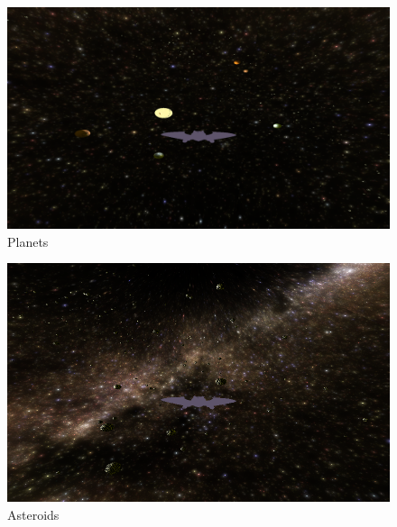 \documentclass[a4paper,12pt]{article}
\begin{document}
\begin{figure}[h!]
        \centering
        \centerline{\includegraphics[width=1.2\textwidth]{bild/planets.png}}
        \caption{Planets}
        \label{fig:planets}
\end{figure}
\begin{figure}[h!]
        \centering
        \centerline{\includegraphics[width=1.2\textwidth]{bild/asteroid.png}}
        \caption{Asteroids}
        \label{fig:asteroids}
\end{figure}
\end{document}
